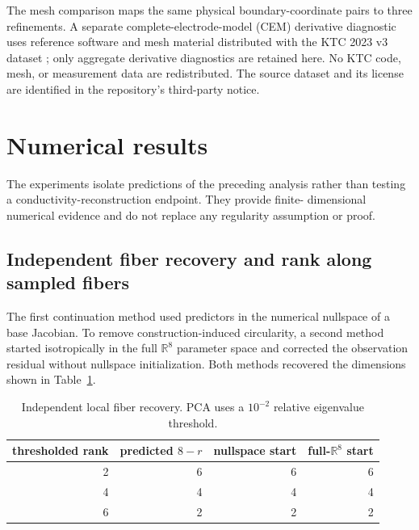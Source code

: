 \documentclass[11pt]{article}
\theoremstyle{definition}
\newcommand{\R}{\mathbb R}
\begin{document}
The mesh comparison maps the same physical boundary-coordinate pairs to three
refinements.  A separate complete-electrode-model (CEM) derivative diagnostic
uses reference software and mesh material distributed with the KTC 2023 v3
dataset \citep{rasanen2024ktc}; only aggregate derivative diagnostics are
retained here.  No KTC code, mesh, or measurement data are redistributed.  The
source dataset and its license are identified in the repository's third-party
notice.

\section{Numerical results}

The experiments isolate predictions of the preceding analysis rather than
testing a conductivity-reconstruction endpoint.  They provide finite-
dimensional numerical evidence and do not replace any regularity assumption or
proof.

\subsection{Independent fiber recovery and rank along sampled fibers}

The first continuation method used predictors in the numerical nullspace of a
base Jacobian.  To remove construction-induced circularity, a second method
started isotropically in the full $\R^8$ parameter space and corrected the
observation residual without nullspace initialization.  Both methods recovered
the dimensions shown in Table~\ref{tab:fibers}.

\begin{table}[ht]
\centering
\caption{Independent local fiber recovery.  PCA uses a $10^{-2}$ relative
eigenvalue threshold.}
\label{tab:fibers}
\begin{tabular}{rrrr}
\toprule
thresholded rank & predicted $8-r$ & nullspace start & full-$\R^8$ start\\
\midrule
2&6&6&6\\
4&4&4&4\\
6&2&2&2\\
\bottomrule
\end{tabular}
\end{table}
\FloatBarrier
\end{document}

